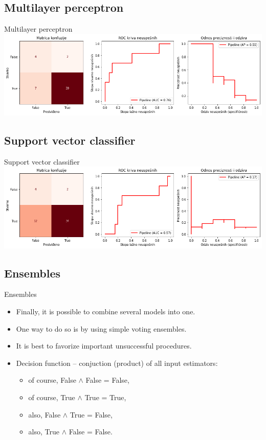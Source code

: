 \documentclass[hyperref={bookmarks=false}]{beamer}
\begin{document}
\subsection{Multilayer perceptron}
\begin{frame}{Multilayer perceptron}
\includegraphics[width=\textwidth]{../slike/mlp.png}
\end{frame}

\subsection{Support vector classifier}
\begin{frame}{Support vector classifier}
\includegraphics[width=\textwidth]{../slike/svc.png}
\end{frame}

\subsection{Ensembles}
\begin{frame}{Ensembles}
\begin{itemize}
    \item Finally, it is possible to combine several models into one.
    \item One way to do so is by using simple voting ensembles.
    \item It is best to favorize important unsuccessful procedures.
    \item Decision function -- conjuction (product) of all input estimators:
    \begin{itemize}
        \item of course, False $\wedge$ False = False,
        \item of course, True $\wedge$ True = True,
        \item also, False $\wedge$ True = False,
        \item also, True $\wedge$ False = False.
    \end{itemize}
\end{itemize}
\end{frame}
\end{document}
